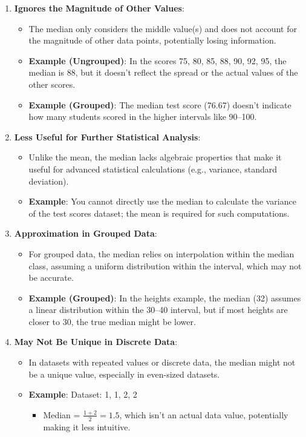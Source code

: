 \documentclass[11pt]{article}
\begin{document}
\begin{enumerate}
    \item \textbf{Ignores the Magnitude of Other Values}:
    \begin{itemize}
        \item The median only considers the middle value(s) and does not account for the magnitude of other data points, potentially losing information.
        \item \textbf{Example (Ungrouped)}: In the scores 75, 80, 85, 88, 90, 92, 95, the median is 88, but it doesn’t reflect the spread or the actual values of the other scores.
        \item \textbf{Example (Grouped)}: The median test score (76.67) doesn’t indicate how many students scored in the higher intervals like 90--100.
    \end{itemize}

    \item \textbf{Less Useful for Further Statistical Analysis}:
    \begin{itemize}
        \item Unlike the mean, the median lacks algebraic properties that make it useful for advanced statistical calculations (e.g., variance, standard deviation).
        \item \textbf{Example}: You cannot directly use the median to calculate the variance of the test scores dataset; the mean is required for such computations.
    \end{itemize}

    \item \textbf{Approximation in Grouped Data}:
    \begin{itemize}
        \item For grouped data, the median relies on interpolation within the median class, assuming a uniform distribution within the interval, which may not be accurate.
        \item \textbf{Example (Grouped)}: In the heights example, the median (32) assumes a linear distribution within the 30--40 interval, but if most heights are closer to 30, the true median might be lower.
    \end{itemize}

    \item \textbf{May Not Be Unique in Discrete Data}:
    \begin{itemize}
        \item In datasets with repeated values or discrete data, the median might not be a unique value, especially in even-sized datasets.
        \item \textbf{Example}: Dataset: 1, 1, 2, 2
        \begin{itemize}
            \item Median = $\frac{1 + 2}{2} = 1.5$, which isn’t an actual data value, potentially making it less intuitive.
        \end{itemize}
    \end{itemize}
\end{enumerate}
\end{document}
